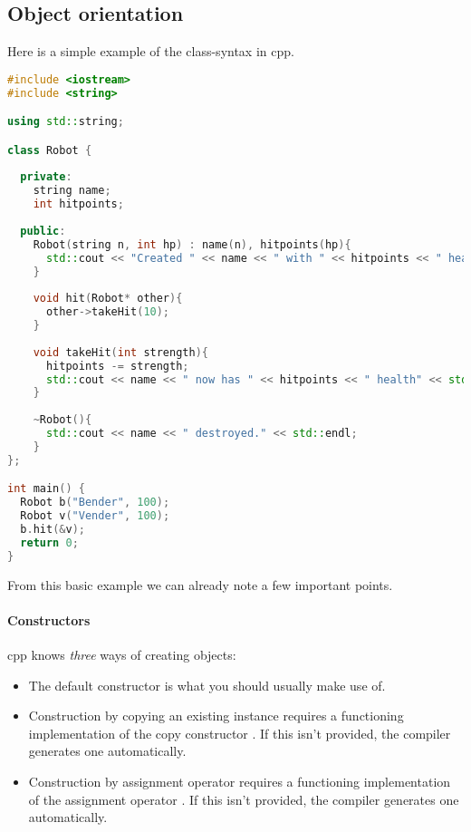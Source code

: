 \subsection{Object orientation}
Here is a simple example of the class-syntax in cpp.

\begin{lstlisting}[language=c++]
#include <iostream>
#include <string>

using std::string;

class Robot {
  
  private:
    string name;
    int hitpoints;
  
  public:
    Robot(string n, int hp) : name(n), hitpoints(hp){
      std::cout << "Created " << name << " with " << hitpoints << " health" << std::endl;
    }
    
    void hit(Robot* other){
      other->takeHit(10);
    }
    
    void takeHit(int strength){
      hitpoints -= strength;
      std::cout << name << " now has " << hitpoints << " health" << std::endl;
    }
    
    ~Robot(){
      std::cout << name << " destroyed." << std::endl;
    }
};

int main() {
  Robot b("Bender", 100);
  Robot v("Vender", 100);
  b.hit(&v);
  return 0;
}
\end{lstlisting}

From this basic example we can already note a few important points.


\paragraph{Constructors} cpp knows \emph{three} ways of creating objects: 
\begin{itemize}
    \item The default constructor  is what you should usually make use of. 
 
    \item Construction by copying an existing instance  requires a functioning implementation of the copy constructor . If this isn't provided, the compiler generates one automatically. 
    
    \item Construction by assignment operator  requires a functioning implementation of the assignment operator . If this isn't provided, the compiler generates one automatically. 
\end{itemize}

